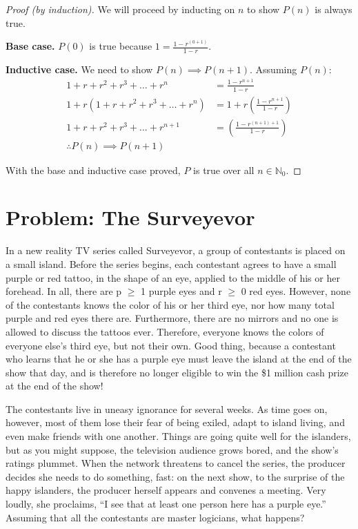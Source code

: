 \documentclass[a4paper]{article}
\begin{document}
\begin{proof}[Proof (by induction)]

	We will proceed by inducting on $n$ to show $P(n)$ is always true.

	\textbf{Base case.} $P(0)$ is true because $1 = \frac{1 - r^{(0 + 1)}}{1 - r}$.

	\textbf{Inductive case.} We need to show $P(n) \implies P(n+1)$. Assuming $P(n)$:
	\begin{align*}
	1 + r + r^{2} + r^{3} + \ldots + r^{n} &=  \frac{1 - r^{n + 1}}{1 - r}\\
	1 + r \left(1 + r + r^{2} + r^{3} + \ldots + r^{n} \right) &= 1 + r \left(\frac{1 - r^{n + 1}}{1 - r}\right)\\
	1 + r + r^{2} + r^{3} + \ldots + r^{n+1} &= \left(\frac{1 - r^{(n + 1) + 1}}{1 - r}\right)\\
	\therefore P(n) \implies P(n+1)
	\end{align*}

	With the base and inductive case proved, $P$ is true over all $n \in
\mathbb{N}_{0}$.  \end{proof}

\section{Problem: The Surveyevor}%
\label{sec:Problem: The Surveyevor}

In a new reality TV series called Surveyevor, a group of contestants is placed on a small
island. Before the series begins, each contestant agrees to have a small purple or red tattoo,
in the shape of an eye, applied to the middle of his or her forehead. In all, there are p $\geq$ 1
purple eyes and r $\geq$ 0 red eyes. However, none of the contestants knows the color of his or
her third eye, nor how many total purple and red eyes there are. Furthermore, there are no
mirrors and no one is allowed to discuss the tattoos ever. Therefore, everyone knows the
colors of everyone else’s third eye, but not their own. Good thing, because a contestant who
learns that he or she has a purple eye must leave the island at the end of the show that day,
and is therefore no longer eligible to win the \$1 million cash prize at the end of the show!

The contestants live in uneasy ignorance for several weeks. As time goes on, however,
most of them lose their fear of being exiled, adapt to island living, and even make friends
with one another. Things are going quite well for the islanders, but as you might suppose,
the television audience grows bored, and the show’s ratings plummet. When the network
threatens to cancel the series, the producer decides she needs to do something, fast: on the
next show, to the surprise of the happy islanders, the producer herself appears and convenes
a meeting. Very loudly, she proclaims, “I see that at least one person here has a purple eye.”
Assuming that all the contestants are master logicians, what happens?
\end{document}
